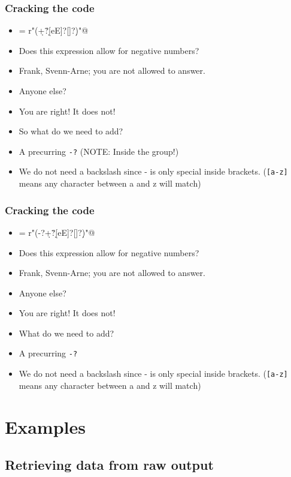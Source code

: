 \documentclass{beamer}
\begin{document}
\begin{frame}[fragile]
\frametitle{Cracking the code}
\scriptsize
\begin{itemize}
\item \verb@anyNumber = r"\s*(\d+\.?\d*[eE]?[\-\+]?\d*)\s*"@
\pause \item Does this expression allow for negative numbers?
\pause \item Frank, Svenn-Arne; you are not allowed to answer.
\pause \item Anyone else?
\pause \item You are right! It does not!
\item So what do we need to add?
\pause \item A precurring \verb+-?+ (NOTE: Inside the group!)
\pause \item We do not need a backslash since - is only special inside brackets. (\verb+[a-z]+ means any character between a and z will match)
\end{itemize}
\normalsize
\end{frame}

\begin{frame}[fragile]
\frametitle{Cracking the code}
\scriptsize
\begin{itemize}
\item \verb@anyNumber = r"\s*(-?\d+\.?\d*[eE]?[\-\+]?\d*)\s*"@
\item Does this expression allow for negative numbers?
\item Frank, Svenn-Arne; you are not allowed to answer.
\item Anyone else?
\item You are right! It does not!
\item What do we need to add?
\item A precurring \verb+-?+
\item We do not need a backslash since - is only special inside brackets. (\verb+[a-z]+ means any character between a and z will match)
\end{itemize}
\normalsize
\end{frame}

\section{Examples}
\subsection{Retrieving data from raw output}
\end{document}

